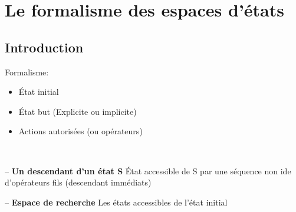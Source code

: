 \documentclass[12pt,a4paper,openany]{book}
\begin{document}
	\tableofcontents
	\chapter{Le formalisme des espaces d'états}
		\section{Introduction}

		Formalisme: 
		\begin{itemize}
			\item État initial
			\item État but (Explicite ou implicite)
			\item Actions autorisées (ou opérateurs)
		\end{itemize}
~

		\begin{definition}{ -- \textbf{Un descendant d'un état S}}
			État accessible de S par une séquence non ide d'opérateurs fils (descendant immédiats)
		\end{definition}

		\begin{definition}{ -- \textbf{Espace de recherche}}
			Les états accessibles de l'état initial\\
			~
		\end{definition}
\end{document}
